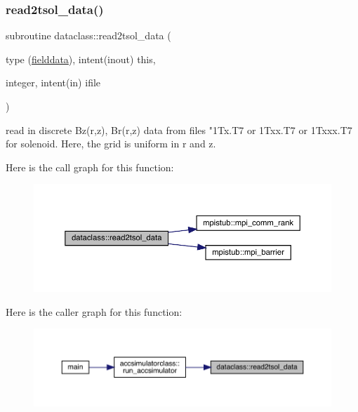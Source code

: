 \subsubsection{\texorpdfstring{read2tsol\_data()}{read2tsol\_data()}}
{\footnotesize\ttfamily subroutine dataclass\+::read2tsol\+\_\+data (\begin{DoxyParamCaption}\item[{type (\mbox{\hyperlink{namespacedataclass_structdataclass_1_1fielddata}{fielddata}}), intent(inout)}]{this,  }\item[{integer, intent(in)}]{ifile }\end{DoxyParamCaption})}



read in discrete Bz(r,z), Br(r,z) data from files "1\+Tx.\+T7 or 1\+Txx.\+T7 or 1\+Txxx.\+T7 for solenoid. Here, the grid is uniform in r and z. 

Here is the call graph for this function\+:\nopagebreak
\begin{figure}[H]
\begin{center}
\leavevmode
\includegraphics[width=350pt]{namespacedataclass_af6df6f58c6c53c92a78e3d512d6a4d03_cgraph}
\end{center}
\end{figure}
Here is the caller graph for this function\+:\nopagebreak
\begin{figure}[H]
\begin{center}
\leavevmode
\includegraphics[width=350pt]{namespacedataclass_af6df6f58c6c53c92a78e3d512d6a4d03_icgraph}
\end{center}
\end{figure}
\mbox{\label{namespacedataclass_a39afae6095340e01362de7d4876aee60}} 
